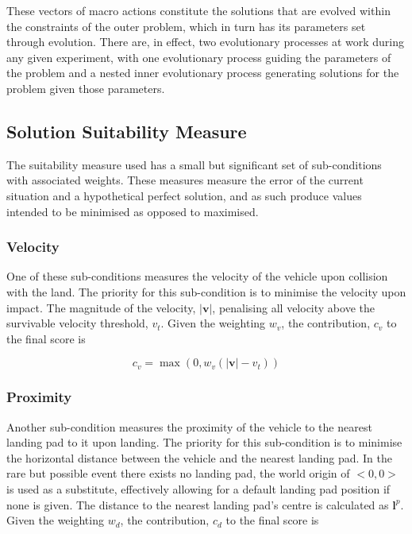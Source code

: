 \documentclass[conference]{IEEEtran}
\begin{document}
These vectors of macro actions constitute the solutions that are evolved within the constraints of the outer problem, which in turn has its parameters set through evolution. There are, in effect, two evolutionary processes at work during any given experiment, with one evolutionary process guiding the parameters of the problem and a nested inner evolutionary process generating solutions for the problem given those parameters.

\subsection{Solution Suitability Measure}

The suitability measure used has a small but significant set of sub-conditions with associated weights. These measures measure the error of the current situation and a hypothetical perfect solution, and as such produce values intended to be minimised as opposed to maximised.

\subsubsection{Velocity}
One of these sub-conditions measures the velocity of the vehicle upon collision with the land. The priority for this sub-condition is to minimise the velocity upon impact. The magnitude of the velocity, $|\boldsymbol {v}|$, penalising all velocity above the survivable velocity threshold, $v_{t}$. Given the weighting $w_{v}$, the contribution, $c_{v}$ to the final score is

\begin{equation}
c_{v} = \max (0, w_{v}(|\boldsymbol {v}| - v_{t}))
\end{equation}

\subsubsection{Proximity}
Another sub-condition measures the proximity of the vehicle to the nearest landing pad to it upon landing. The priority for this sub-condition is to minimise the horizontal distance between the vehicle and the nearest landing pad. In the rare but possible event there exists no landing pad, the world origin of $<0, 0>$ is used as a substitute, effectively allowing for a default landing pad position if none is given. The distance to the nearest landing pad's centre is calculated as $\boldsymbol {l}^{p}$. Given the weighting $w_{d}$, the contribution, $c_{d}$ to the final score is
\end{document}
